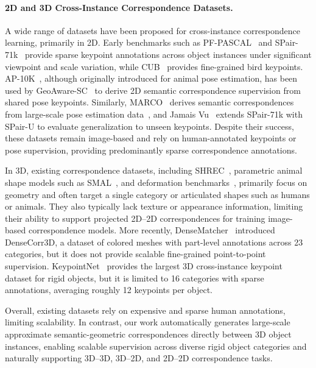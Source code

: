 \paragraph{2D and 3D Cross-Instance Correspondence Datasets.}
A wide range of datasets have been proposed for cross-instance correspondence learning, primarily in 2D. Early benchmarks such as PF-PASCAL~\cite{ham2018pascal_proposalflow} and SPair-71k~\cite{min2019spair71k} provide sparse keypoint annotations across object instances under significant viewpoint and scale variation, while CUB~\cite{WahCUB_200_2011} provides fine-grained bird keypoints. AP-10K~\cite{yu2021AP10k}, although originally introduced for animal pose estimation, has been used by GeoAware-SC~\cite{zhang2024tellingLeftFromRight} to derive 2D semantic correspondence supervision from shared pose keypoints. Similarly, MARCO~\cite{cuttano2026marco} derives semantic correspondences from large-scale pose estimation data~\cite{xu2022poseforeverything}, and Jamais Vu~\cite{mariotti2025jamaisvu} extends SPair-71k with SPair-U to evaluate generalization to unseen keypoints. Despite their success, these datasets remain image-based and rely on human-annotated keypoints or pose supervision, providing predominantly sparse correspondence annotations.

In 3D, existing correspondence datasets, including
SHREC~\cite{pratikakis2016shrec_16,dyke2019shrec_19}, parametric animal shape models such as
SMAL~\cite{zuffi2017menagerie}, and deformation benchmarks~\cite{groueix2018b3dcodeddataset}, primarily focus on geometry and often target a single category or articulated shapes such as humans or animals. They also typically lack texture or appearance information, limiting their ability to support projected 2D--2D correspondences for training image-based correspondence models. More recently, DenseMatcher~\cite{zhu2025densematcher} introduced DenseCorr3D, a dataset of colored meshes with part-level annotations across 23 categories, but it does not provide scalable fine-grained point-to-point supervision. KeypointNet~\cite{you2020} provides the largest 3D cross-instance keypoint dataset for rigid objects, but it is limited to 16 categories with sparse annotations, averaging roughly 12 keypoints per object.

Overall, existing datasets rely on expensive and sparse human annotations, limiting scalability. In contrast, our work automatically generates large-scale approximate semantic-geometric correspondences directly between 3D object instances, enabling scalable supervision across diverse rigid object categories and naturally supporting 3D--3D, 3D--2D, and 2D--2D correspondence tasks.


